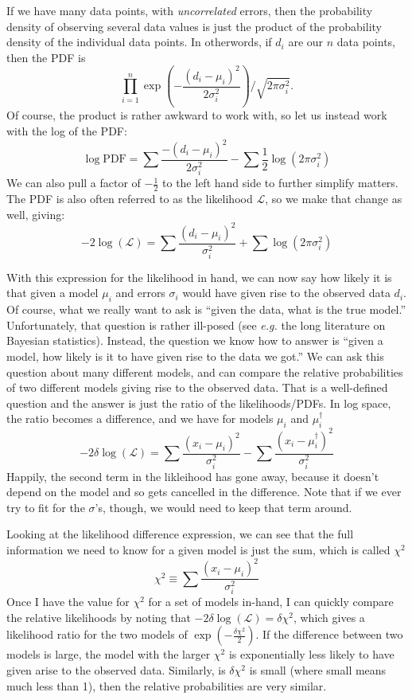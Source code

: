 \documentclass[letterpaper,11pt,preprint]{aastex}
\begin{document}
{If we have many data points, with {\textit{uncorrelated}} errors, then
the probability density of observing several data values is just the
product of the probability density of the individual data points.  In
otherwords, if $d_i$ are our $n$ data points, then the PDF is 
$$\prod_{i=1}^n
\exp(-\frac{(d_i-\mu_i)^2}{2\sigma_i^2})/\sqrt{2\pi\sigma_i^2}.$$  
Of course, the product is rather awkward to work with, so let us
instead work with the log of the PDF:
$$\log{\textrm{PDF}}=\sum \frac{-(d_i-\mu_i)^2}{2\sigma_i^2}-\sum \frac{1}{2}\log(2\pi\sigma_i^2)$$
We can also pull a factor of $-\frac{1}{2}$ to the left hand side to
further simplify matters. The PDF is also often referred to as the
likelihood $\mathcal{L}$, so we make that change as well, giving:
$$-2\log(\mathcal{L}) = \sum\frac{(d_i-\mu_i)^2}{\sigma_i^2}+\sum \log(2\pi\sigma_i^2)$$

With this expression for the likelihood in hand, we can now say how
likely it is that given a model $\mu_i$ and errors $\sigma_i$ would
have given rise to the observed data $d_i$.  Of course, what we really
want to ask is ``given the data, what is the true model.''
Unfortunately, that question is rather ill-posed (see {\textit{e.g.}}
the long literature on Bayesian statistics).  Instead, the question we know
how to answer is ``given a model, how likely is it to have given rise
to the data we got.''  We can ask this question about many different
models, and can compare the relative probabilities of two different
models giving rise to the observed data.  That is a well-defined
question and the answer is just the ratio of the likelihoods/PDFs.  In
log space, the ratio becomes a difference, and we have for models
$\mu_i$ and $\mu^\dag_i$
$$-2 \delta \log(\mathcal{L}) = \sum\frac{(x_i-\mu_i)^2}{\sigma_i^2}-\sum\frac{(x_i-\mu^\dag_i)^2}{\sigma_i^2}$$
Happily, the second term in the likleihood has gone away, because it
doesn't depend on the model and so gets cancelled in the difference.
Note that if we ever try to fit for the $\sigma$'s, though, we would
need to keep that term around.  

Looking at the likelihood difference expression, we can see that the
full information we need to know for a given model is just the sum,
which is called $\chi^2$
$$\chi^2 \equiv \sum\frac{(x_i-\mu_i)^2}{\sigma_i^2}$$
Once I have the value for $\chi^2$ for a set of models in-hand, I can
quickly compare the relative likelihoods by noting that $-2\delta
\log(\mathcal{L})=\delta \chi^2$, which gives a likelihood ratio for
the two models of $\exp(-\frac{\delta \chi^2}{2})$.  If the difference
between two models is large, the model with the larger $\chi^2$ is
exponentially less likely to have given arise to the observed data.
Similarly, is $\delta \chi^2$ is small (where small means much less
than 1), then the relative probabilities are very similar.  

}
\end{document}
